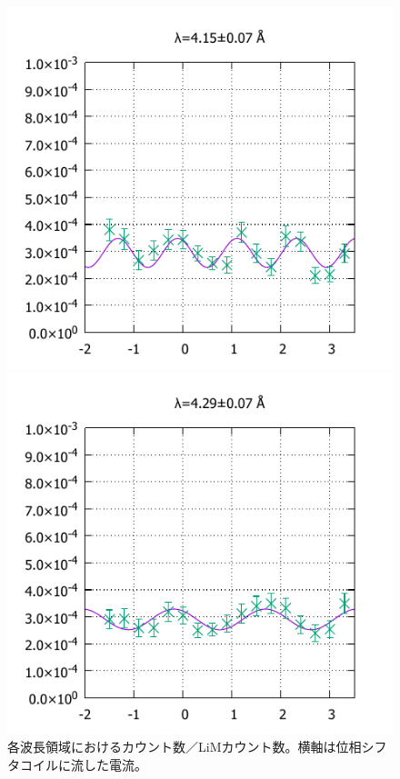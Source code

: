 \begin{figure}[H]
\begin{minipage}{0.33\hsize}
\includegraphics[width=\imgwidth]{phase_shifter/wl/wlf10.pdf}
\end{minipage}
\begin{minipage}{0.33\hsize}
\includegraphics[width=\imgwidth]{phase_shifter/wl/wlf8.pdf}
\end{minipage}
\caption{各波長領域におけるカウント数／LiMカウント数。横軸は位相シフタコイルに流した電流。}
\end{figure}

